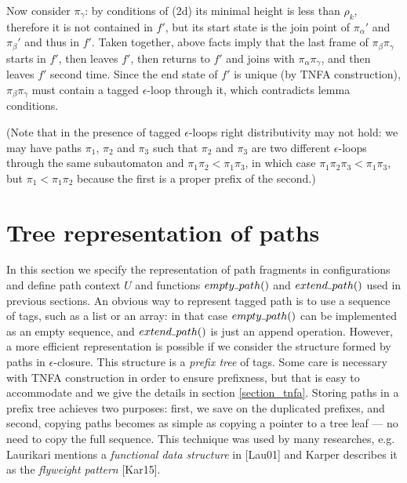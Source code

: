 \documentclass[AMA,STIX1COL]{WileyNJD-v2}
\newcommand{\Xund}{\rule{.4em}{.4pt}}
\begin{document}
\begin{proofEnd}
\begin{itemize}[itemsep=0.5em, topsep=0.5em]
\begin{itemize}
            Now consider $\pi_\gamma$: by conditions of (2d) its minimal height is less than $\rho_k$,
            therefore it is not contained in $f'$,
            but its start state is the join point of $\pi_\alpha'$ and $\pi_\beta'$ and thus in $f'$.
            Taken together, above facts imply that the last frame of $\pi_\beta \pi_\gamma$
            starts in $f'$, then leaves $f'$, then returns to $f'$ and joins with $\pi_\alpha \pi_\gamma$,
            and then leaves $f'$ second time.
            Since the end state of $f'$ is unique (by TNFA construction),
            $\pi_\beta \pi_\gamma$ must contain a tagged $\epsilon$-loop through it,
            which contradicts lemma conditions.
        \end{itemize}
    \end{itemize}
    (Note that in the presence of tagged $\epsilon$-loops right distributivity may not hold:
    we may have paths $\pi_1$, $\pi_2$ and $\pi_3$
    such that $\pi_2$ and $\pi_3$ are two different $\epsilon$-loops through the same subautomaton
    and $\pi_1 \pi_2 < \pi_1 \pi_3$,
    in which case $\pi_1 \pi_2 \pi_3 < \pi_1 \pi_3$,
    but $\pi_1 < \pi_1 \pi_2$ because the first is a proper prefix of the second.)
\end{proofEnd}


\section{Tree representation of paths}\label{section_pathtree}

In this section we specify the representation of path fragments in configurations
and define path context $U$ and functions $empty \Xund path ()$ and $extend \Xund path ()$
used in previous sections.
%
An obvious way to represent tagged path is to use a sequence of tags, such as a list or an array:
in that case $empty \Xund path ()$ can be implemented as an empty sequence,
and $extend \Xund path ()$ is just an append operation.
%
However, a more efficient representation is possible
if we consider the structure formed by paths in $\epsilon$-closure.
This structure is a \emph{prefix tree} of tags.
Some care is necessary with TNFA construction in order to ensure prefixness,
but that is easy to accommodate and we give the details in section \ref{section_tnfa}.
Storing paths in a prefix tree achieves two purposes:
first, we save on the duplicated prefixes,
and second, copying paths becomes as simple as copying a pointer to a tree leaf --- no need to copy the full sequence.
This technique was used by many researches, e.g. Laurikari mentions a \emph{functional data structure} in [Lau01]
and Karper describes it as the \emph{flyweight pattern} [Kar15].
\\
\end{document}
